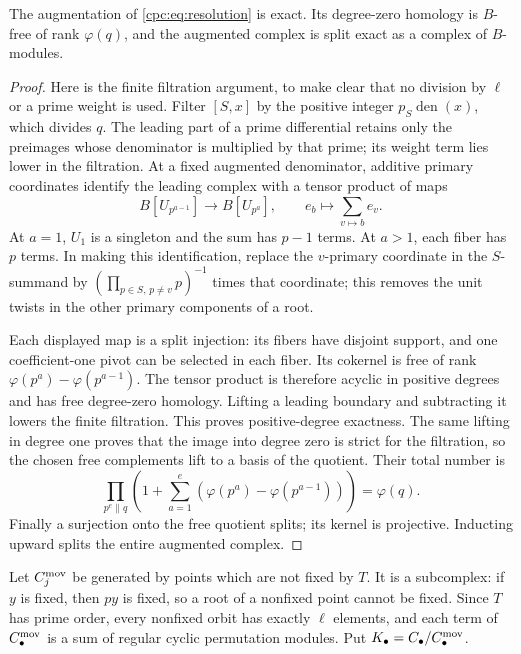 \begin{lemma}
\label{cpc:lem:resolution}
The augmentation of \eqref{cpc:eq:resolution} is exact. Its degree-zero
homology is $B$-free of rank $\varphi(q)$, and the augmented complex
is split exact as a complex of $B$-modules.
\end{lemma}
\begin{proof}
Here is the finite filtration argument, to make clear that no division
by $\ell$ or a prime weight is used. Filter $[S,x]$ by the positive
integer $p_S\operatorname{den}(x)$, which divides $q$. The leading
part of a prime differential retains only the preimages whose
denominator is multiplied by that prime; its weight term lies lower
in the filtration. At a fixed augmented denominator, additive primary
coordinates identify the leading complex with a tensor product of
maps
\[
 B[U_{p^{a-1}}]\longrightarrow B[U_{p^a}],
 \qquad e_b\longmapsto\sum_{v\mapsto b}e_v.
\]
At $a=1$, $U_1$ is a singleton and the sum has $p-1$ terms.
At $a>1$, each fiber has $p$ terms. In making this identification,
replace the $v$-primary coordinate in the $S$-summand by
$(\prod_{p\in S,\,p\ne v}p)^{-1}$ times that coordinate; this
removes the unit twists in the other primary components of a root.

Each displayed map is a split injection: its fibers have disjoint
support, and one coefficient-one pivot can be selected in each fiber.
Its cokernel is free of rank
$\varphi(p^a)-\varphi(p^{a-1})$. The tensor product is therefore
acyclic in positive degrees and has free degree-zero homology.
Lifting a leading boundary and subtracting it lowers the finite
filtration. This proves positive-degree exactness. The same lifting
in degree one proves that the image into degree zero is strict for
the filtration, so the chosen free complements lift to a basis of
the quotient. Their total number is
\[
 \prod_{p^e\parallel q}
 \left(1+\sum_{a=1}^{e}
      (\varphi(p^a)-\varphi(p^{a-1}))\right)=\varphi(q).
\]
Finally a surjection onto the free quotient splits; its kernel is
projective. Inducting upward splits the entire augmented complex.
\end{proof}

Let $C_j^{\rm mov}$ be generated by points which are not fixed by
$T$. It is a subcomplex: if $y$ is fixed, then $py$ is fixed, so a
root of a nonfixed point cannot be fixed. Since $T$ has prime order,
every nonfixed orbit has exactly $\ell$ elements, and each term of
$C_\bullet^{\rm mov}$ is a sum of regular cyclic permutation modules.
Put $K_\bullet=C_\bullet/C_\bullet^{\rm mov}$.

